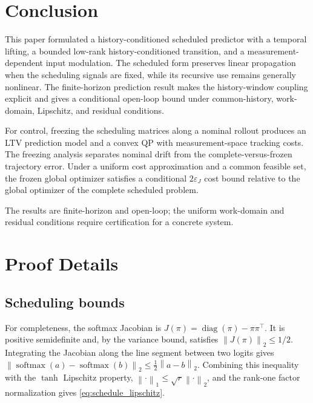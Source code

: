 \documentclass[journal]{IEEEtran}
\newcommand{\norm}[1]{\left\lVert #1\right\rVert}
\begin{document}
\section{Conclusion}
\label{sec:conclusion}

This paper formulated a history-conditioned scheduled predictor with a temporal lifting, a bounded low-rank history-conditioned transition, and a measurement-dependent input modulation. The scheduled form preserves linear propagation when the scheduling signals are fixed, while its recursive use remains generally nonlinear. The finite-horizon prediction result makes the history-window coupling explicit and gives a conditional open-loop bound under common-history, work-domain, Lipschitz, and residual conditions.

For control, freezing the scheduling matrices along a nominal rollout produces an LTV prediction model and a convex QP with measurement-space tracking costs. The freezing analysis separates nominal drift from the complete-versus-frozen trajectory error. Under a uniform cost approximation and a common feasible set, the frozen global optimizer satisfies a conditional $2\varepsilon_J$ cost bound relative to the global optimizer of the complete scheduled problem.

The results are finite-horizon and open-loop; the uniform work-domain and residual conditions require certification for a concrete system.

\appendices

\section{Proof Details}
\label{app:proofs}

\subsection*{Scheduling bounds}
For completeness, the softmax Jacobian is $J(\pi)=\operatorname{diag}(\pi)-\pi\pi^\top$. It is positive semidefinite and, by the variance bound, satisfies $\norm{J(\pi)}_2\le1/2$. Integrating the Jacobian along the line segment between two logits gives $\norm{\operatorname{softmax}(a)-\operatorname{softmax}(b)}_2\le\frac12\norm{a-b}_2$. Combining this inequality with the $\tanh$ Lipschitz property, $\norm{\cdot}_1\le\sqrt r\norm{\cdot}_2$, and the rank-one factor normalization gives \eqref{eq:schedule_lipschitz}.
\end{document}
